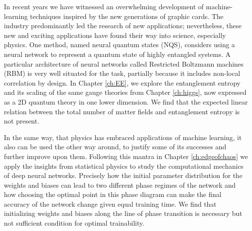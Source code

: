 In recent years we have witnessed an overwhelming development of machine-learning techniques inspired by the new generations of graphic cards. The industry predominantly led the research of new applications; nevertheless, these new and exciting applications have found their way into science, especially physics. One method, named neural quantum states (NQS), considers using a neural network to represent a quantum state of highly entangled systems. A particular architecture of neural networks called Restricted Boltzmann machines (RBM) is very well situated for the task, partially because it includes non-local correlation by design. In Chapter \ref{ch:EE}, we explore the entanglement entropy and its scaling of the same gauge theories from Chapter \ref{ch:higgs}, now expressed as a 2D quantum theory in one lower dimension. We find that the expected linear relation between the total number of matter fields and entanglement entropy is not present.

In the same way, that physics has embraced applications of machine learning, it also can be used the other way around, to justify some of its successes and further improve upon them. Following this mantra in Chapter \ref{ch:edgeofchaos} we apply the insights from statistical physics to study the computational mechanics of deep neural networks. Precisely how the initial parameter distribution for the weights and biases can lead to two different phase regimes of the network and how choosing the optimal point in this phase diagram can make the final accuracy of the network change given equal training time. We find that initializing weights and biases along the line of phase transition is necessary but not sufficient condition for optimal trainability.  


\newpage
\thispagestyle{empty}
